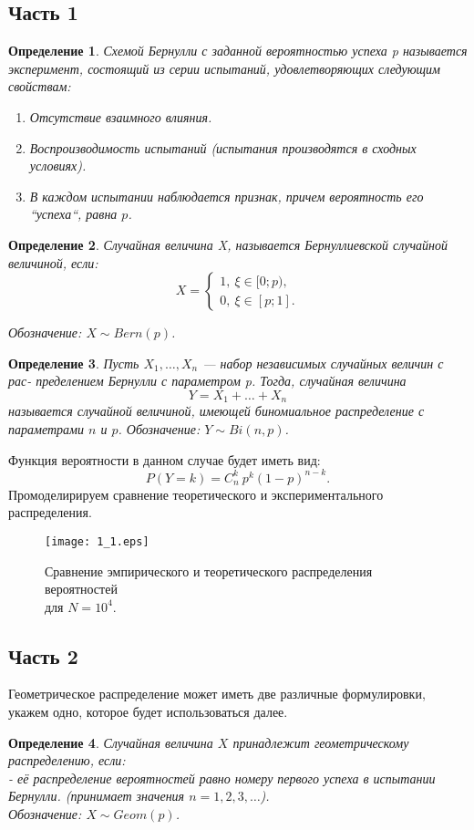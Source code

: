 \documentclass[11pt]{article}
\newtheorem{definition}{Определение}[section]
\begin{document}
\subsection{Часть 1}

\begin{definition}
 Схемой Бернулли с заданной вероятностью успеха p называется эксперимент, состоящий из серии испытаний, удовлетворяющих следующим свойствам:
 \begin{enumerate}
  \item Отсутствие взаимного влияния.
  \item Воспроизводимость испытаний (испытания производятся в сходных условиях).
  \item В каждом испытании наблюдается признак, причем вероятность его ``успеха``, равна $p$.
 \end{enumerate}
 
\end{definition}

\begin{definition}
  Случайная величина X, называется Бернуллиевской случайной величиной, если:
\[
 X = 
  \begin{cases}
    1,~ \xi \in [0;p), \\
    0,~ \xi \in [p;1].
  \end{cases}
\]

Обозначение: $X \sim Bern(p)$.
\end{definition}

\begin{definition}
 Пусть $X_1 ,\ldots, X_n$ — набор независимых случайных величин с рас-
пределением Бернулли с параметром p. Тогда, случайная величина
\[
  Y = X_1 + \ldots + X_n
\]
называется случайной величиной, имеющей биномиальное распределение с параметрами
$n$ и $p$.
Обозначение: $Y \sim Bi(n, p)$.
\end{definition}

Функция вероятности в данном случае будет иметь вид:
\[
 P(Y = k) = C_n^k~ p^k (1-p)^{n-k}.
\]
Промоделирируем сравнение теоретического и экспериментального распределения.

\begin{figure}[ht]

    \texttt{[image: 1\_1.eps]} 
    \caption{Сравнение эмпирического и теоретического распределения вероятностей \\ 
    для $N=10^4$.}
\end{figure}    
\FloatBarrier


\subsection{Часть 2}
Геометрическое распределение может иметь две различные формулировки, укажем одно, которое будет использоваться далее.
\begin{definition}
 Случайная величина $X$ принадлежит геометрическому распределению, если: \\
 - её распределение вероятностей равно номеру первого успеха в испытании Бернулли. (принимает значения $n=1,2,3,\ldots$). \\
Обозначение: $X \sim Geom(p)$. 
\end{definition}
\end{document}
